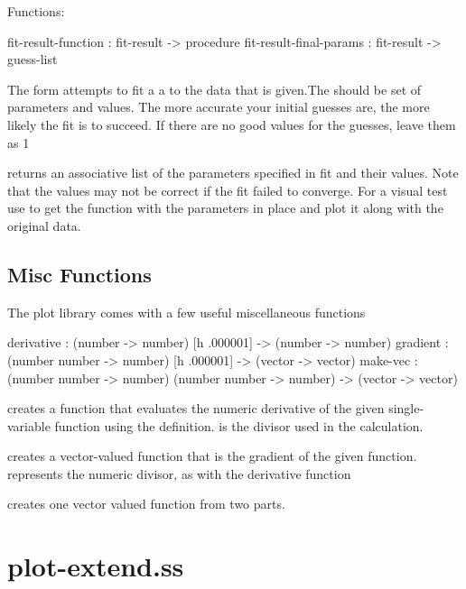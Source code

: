 \documentclass{article}
\begin{document}
{\begin{schemedisplay}
Functions:

  fit-result-function : fit-result -> procedure
  fit-result-final-params : fit-result -> guess-list

\end{schemedisplay}



The  form attempts to fit a a  to the data that is given.The should be set of parameters and values. The more accurate  your initial guesses are, the more likely the fit is to succeed. If there are no good values for the guesses, leave them as 1


 returns an associative list of the parameters specified  in fit
 and their values. Note that the values may not be correct if the fit failed to converge. 
For a visual test use  to get the function with the parameters 
in place and plot it along with the original data.

\subsection{Misc Functions}


The plot library comes with a few useful miscellaneous functions


\begin{schemedisplay}

derivative      : (number -> number) [h .000001] -> (number -> number)   
gradient : (number number -> number) [h .000001] -> (vector -> vector)
make-vec : (number number -> number) (number number -> number) -> (vector -> vector) 
\end{schemedisplay}

 creates a function that evaluates the numeric derivative of the given  single-variable function using the definition.  is the divisor used in the calculation.


 creates a vector-valued function that is the gradient of the given function. represents the numeric divisor, as with the derivative function


 creates one vector valued function from two parts.

\pagebreak


\label{plot-extend.ss}
\section{plot-extend.ss}



}
\end{document}
